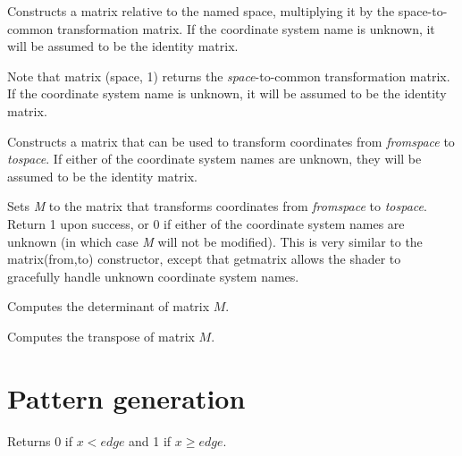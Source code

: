 \documentclass[11pt,letterpaper]{book}
\def\matrix{{\cf matrix}\xspace}
\begin{document}
Constructs a \matrix relative to the named space, multiplying it by the
{\cf space}-to-{\cf common} transformation matrix.  If the coordinate
system name is unknown, it will be assumed to be the identity matrix.

Note that {\cf matrix (space, 1)} returns the 
\emph{space}-to-{\cf common} transformation matrix. If the coordinate
system name is unknown, it will be assumed to be the identity matrix.
\apiend

Constructs a \matrix that can be used to transform coordinates from
\emph{fromspace} to \emph{tospace}.  If either of the coordinate
system names are unknown, they will be assumed to be the identity matrix.
\apiend


Sets \emph{M} to the \matrix that transforms coordinates from
\emph{fromspace} to \emph{tospace}.  Return 1 upon success, or 0 if
either of the coordinate system names are unknown (in which case
\emph{M} will not be modified).  This is very similar to the
{\cf matrix(from,to)} constructor, except that {\cf getmatrix} allows
the shader to gracefully handle unknown coordinate system names.
\apiend

Computes the determinant of matrix $M$.
\apiend

Computes the transpose of matrix $M$.
\apiend


\begin{comment}
translate
rotate
scale
\end{comment}


\section{Pattern generation}
\label{sec:stdlib:pattern}

Returns 0 if $x < {\mathit edge}$ and 1 if $x \ge {\mathit edge}$.
\end{document}
